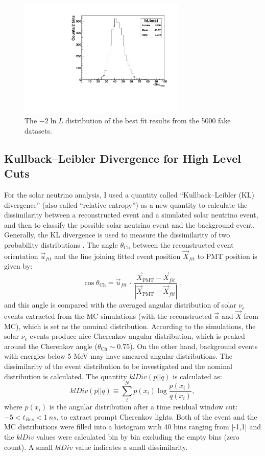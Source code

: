 \begin{figure}[!htb]
	\centering
	\includegraphics[width=8cm]{ensemble_lnLbest.pdf}
	\caption{The $-2\ln L$ distribution of the best fit results from the 5000 fake datasets. \label{poisson_fitLnL}}
\end{figure}

\subsection{Kullback–Leibler Divergence for High Level Cuts}

For the solar neutrino analysis, I used a quantity called ``Kullback–Leibler (KL) divergence'' (also called ``relative entropy'') as a new quantity to calculate the dissimilarity between a reconstructed event and a simulated solar neutrino event, and then to classify the possible solar neutrino event and the background event. Generally, the KL divergence is used to measure the dissimilarity of two probability distributions \cite{murphy2012machine}. The angle $\theta_\mathrm{Ch}$ between the reconstructed event orientation $\vec{u}_{fit}$ and the line joining fitted event position $\vec{X}_{fit}$ to PMT position is given by:
\begin{equation*}
\cos\theta_\mathrm{Ch}=\vec{u}_{fit} \, \cdot \, \frac{\vec{X}_\mathrm{PMT}-\vec{X}_{fit}}{|\vec{X}_\mathrm{PMT}-\vec{X}_{fit}|} \; ,
\end{equation*}
and this angle is compared with the averaged angular distribution of solar $\nu_e$ events extracted from the MC simulations (with the reconstructed $\vec{u}$ and $\vec{X}$ from MC), which is set as the nominal distribution. According to the simulations, the solar $\nu_e$ events produce nice Cherenkov angular distribution, which is peaked around the Cherenkov angle ($\theta_\mathrm{Ch}\sim 0.75$). On the other hand, background events with energies below 5 MeV may have smeared angular distributions. The dissimilarity of the event distribution to be investigated and the nominal distribution is calculated. The quantity $klDiv(p||q)$ is calculated as: 
\begin{equation}\label{eq:kldiv}
klDiv(p||q) \equiv \sum_{i}^N p(x_i)\log{\frac{p(x_i)}{q(x_i)}},
\end{equation}
where $p(x_i)$ is the angular distribution after a time residual window cut: $-5<t_{Res}<1~ns$, to extract prompt Cherenkov lights. Both of the event and the MC distributions were filled into a histogram with 40 bins ranging from [-1,1] and the $klDiv$ values were calculated bin by bin excluding the empty bins (zero count). A small $klDiv$ value indicates a small dissimilarity.

